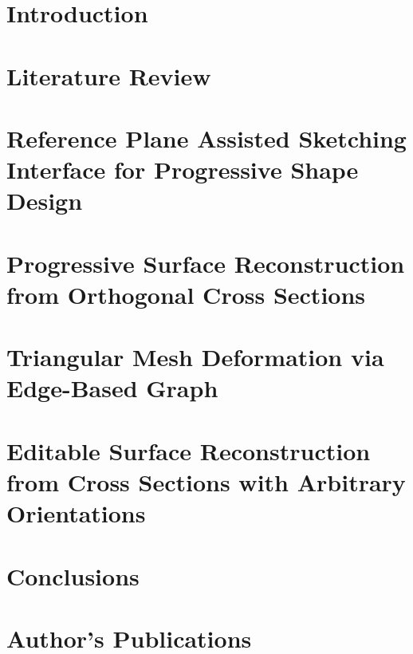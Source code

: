 \documentclass{puthesis}
\author{WANG KAI}
\begin{document}
\pagestyle{fancy}
\fancyhead{}
\fancyhead[R]{\nouppercase{\small\bfseries\rightmark}}


\chapter{Introduction}\label{ch:introduction}


\chapter{Literature Review}\label{ch:review}


\chapter{Reference Plane Assisted Sketching Interface for Progressive Shape Design}\label{ch:planeSBIM}


\chapter{Progressive Surface Reconstruction from Orthogonal Cross Sections}\label{ch:orthsurf}


\chapter{Triangular Mesh Deformation via Edge-Based Graph}\label{ch:flexdeformation}



\chapter{Editable Surface Reconstruction from Cross Sections with Arbitrary Orientations}\label{ch:editsurf}



\chapter{Conclusions}\label{ch:conclusion}



\clearpage
\renewcommand{\bibname}{References}





\clearpage
{}
\chapter*{Author's Publications}

\end{document}
